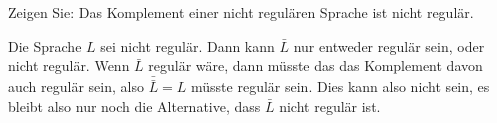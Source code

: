 Zeigen Sie: Das Komplement einer nicht regulären Sprache ist nicht
regulär.


\begin{loesung}
Die Sprache $L$ sei nicht regulär. Dann kann $\bar L$ nur
entweder regulär sein, oder nicht regulär. Wenn $\bar L$
regulär wäre, dann müsste das das Komplement davon
auch regulär sein, also $\bar{\bar L}=L$ müsste regulär sein.
Dies kann also nicht sein, es bleibt also nur noch die Alternative,
dass $\bar L$ nicht regulär ist.
\end{loesung}

